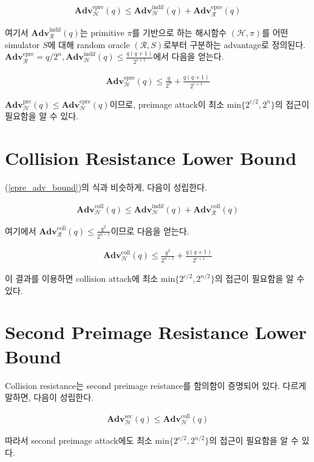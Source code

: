 \documentclass{article}
\newcommand{\adv}{\mathbf{Adv}}
\begin{document}
  \begin{align}\label{epre_adv_bound}
    \adv^\text{epre}_\mathcal{H}(q) \leq \adv^\text{indif}_\mathcal{H}(q) + \adv^\text{epre}_\mathcal{R}(q)
  \end{align}

  여기서 \(\adv^\text{indif}_\mathcal{R}(q)\)는 primitive \(\pi\)를 기반으로 하는 해시함수 \((\mathcal{H}, \pi)\)를 어떤 simulator \(S\)에 대해 random oracle \((\mathcal{R}, S)\)로부터 구분하는 advantage로 정의된다. \(\adv^\text{epre}_\mathcal{R}=q/2^n, \adv^\text{indif}_\mathcal{H}(q)\leq \frac{q(q + 1)}{2^{c + 1}}\)에서 다음을 얻는다.

  \begin{align*}
    \adv^\text{epre}_\mathcal{H}(q) \leq \frac{q}{2^n} + \frac{q(q + 1)}{2^{c + 1}}
  \end{align*}

  \(\adv^\text{pre}_\mathcal{H}(q) \leq \adv^\text{epre}_\mathcal{H}(q)\)이므로\cite{rogaway_cryptographic_2004}, preimage attack이 최소 \(\mathrm{min}\{2^{c/2}, 2^n\}\)의 접근이 필요함을 알 수 있다.

  \section{Collision Resistance Lower Bound}
  (\ref{epre_adv_bound})의 식과 비슷하게, 다음이 성립한다.

  \begin{align*}
    \adv^\text{coll}_\mathcal{H}(q) \leq \adv^\text{indif}_\mathcal{H}(q) + \adv^\text{coll}_\mathcal{R}(q)
  \end{align*}

  여기에서 \(\adv^\text{coll}_\mathcal{R}(q) \leq \frac{q^2}{2^{n - 1}}\)이므로 다음을 얻는다.

  \begin{align*}
    \adv^\text{coll}_\mathcal{H}(q) \leq \frac{q^2}{2^{n - 1}} + \frac{q(q + 1)}{2^{c + 1}}
  \end{align*}

  이 결과를 이용하면 collision attack에 최소 \(\mathrm{min}\{2^{c/2}, 2^{n/2}\}\)의 접근이 필요함을 알 수 있다.

  \section{Second Preimage Resistance Lower Bound}
  Collision resistance는 second preimage reistance를 함의함이 증명되어 있다.\cite{rogaway_cryptographic_2004} 다르게 말하면, 다음이 성립한다.

  \begin{align*}
    \adv^\text{sec}_\mathcal{H}(q) \leq \adv^\text{coll}_\mathcal{H}(q)
  \end{align*}

  따라서 second preimage attack에도 최소 \(\mathrm{min}\{2^{c/2}, 2^{n/2}\}\)의 접근이 필요함을 알 수 있다.
  \printbibliography
\end{document}
